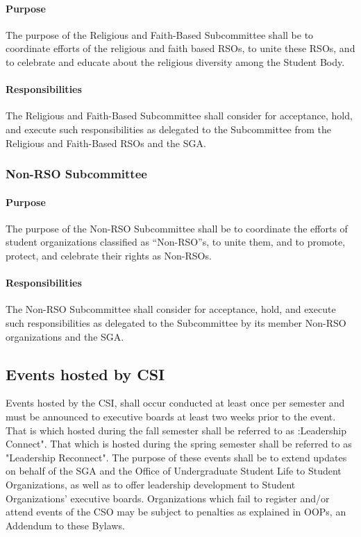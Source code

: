 \documentclass[12pt]{scrreprt}
\begin{document}
\paragraph{Purpose}
​The purpose of the Religious and Faith-Based Subcommittee shall be to
coordinate efforts of the religious and faith based RSOs, to unite these RSOs, and to
celebrate and educate about the religious diversity among the Student Body.

\paragraph{Responsibilities}
The Religious and Faith-Based Subcommittee shall consider for
acceptance, hold, and execute such responsibilities as delegated to the Subcommittee from
the Religious and Faith-Based RSOs and the SGA.

\subsubsection{Non-RSO Subcommittee}

\paragraph{Purpose}
​The purpose of the Non-RSO Subcommittee shall be to coordinate the efforts of
student organizations classified as “Non-RSO”s, to unite them, and to promote, protect, and
celebrate their rights as Non-RSOs.

\paragraph{Responsibilities}
The Non-RSO Subcommittee shall consider for acceptance, hold, and
execute such responsibilities as delegated to the Subcommittee by its member Non-RSO
organizations and the SGA.

\subsection{Events hosted by CSI}
Events hosted by the CSI,  shall occur conducted at least once per semester and must be announced to executive boards at least two weeks prior to the event. That is which hosted during the fall semester shall be referred to as :Leadership Connect". That which is hosted during the spring semester shall be referred to as "Leadership Reconnect". The purpose of these events shall be to extend updates on behalf of the SGA
and the Office of Undergraduate Student Life to Student Organizations, as well as to offer
leadership development to Student Organizations’ executive boards. Organizations which fail to register and/or attend events of the CSO may be subject to penalties as explained in OOPs, an Addendum to these Bylaws.
\end{document}
